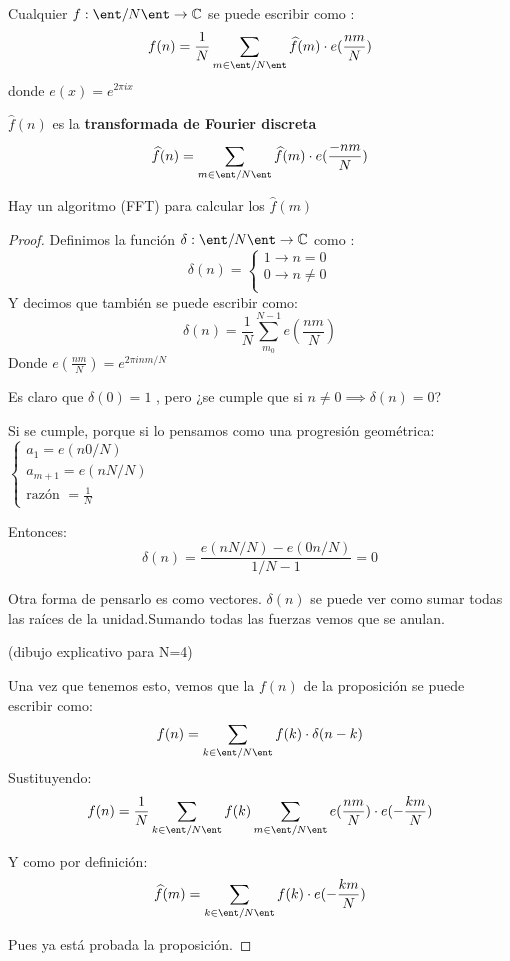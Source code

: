 \begin{prop}
	
	Cualquier $f : \ent/N\ent \rightarrow \mathbb{C}$ se puede escribir como :
	$$f(n) = \frac{1}{N}\sum_{m\in \ent/N\ent}\widehat{f}(m)\cdot e(\frac{nm}{N})$$
	donde $e(x) = e^{2\pi ix}$
	
	$\widehat{f}(n)$ es la \textbf{transformada de Fourier discreta}
	$$\widehat{f}(n) = \sum_{m\in \ent/N\ent}\widehat{f}(m)\cdot e(\frac{-nm}{N})$$
	
\end{prop}
\obs Hay un algoritmo (FFT) para calcular los $\widehat{f}(m)$

\begin{proof}
	Definimos la función $\delta : \ent/N\ent \rightarrow \mathbb{C}$ como :
	$$\delta (n) = \begin{cases}
	1 \rightarrow n=0\\
	0 \rightarrow n\neq 0 \\
	\end{cases}$$
	Y decimos que también se puede escribir como:
	$$\delta (n) = \frac{1}{N} \sum_{m_0}^{N-1} e(\frac{nm}{N})$$
	Donde $e(\frac{nm}{N}) = e^{2\pi inm/N}$
	
	Es claro que $\delta(0) = 1$ , pero ¿se cumple que si $n\neq 0 \implies \delta (n) = 0$?
	
	Si se cumple, porque si lo pensamos como una progresión geométrica:
	$\begin{cases}
	a_1 = e(n0/N)\\
	a_{m+1} = e(nN/N)\\
	\text{razón } = \frac{1}{N}
	\end{cases}$
	
	Entonces:
	$$\delta (n) = \frac{e(nN/N) - e(0n/N)}{1/N - 1} = 0$$
	
	Otra forma de pensarlo es como vectores. $\delta(n)$ se puede ver como sumar todas las raíces de la unidad.Sumando todas las fuerzas vemos que se anulan.
	
	(dibujo explicativo para N=4)
	
	Una vez que tenemos esto, vemos que la $f(n)$ de la proposición se puede escribir como:
	$$f(n) = \sum_{k\in \ent/N\ent} f(k) \cdot \delta(n-k)$$
	Sustituyendo:
	$$f(n) = \frac{1}{N} \sum_{k\in \ent/N\ent} f(k)  \sum_{m \in \ent/N\ent} e(\frac{nm}{N}) \cdot e(- \frac{km}{N})$$
	
	Y como por definición:
	$$\widehat{f}(m) = \sum_{k\in \ent/N\ent} f(k) \cdot e(- \frac{km}{N})$$
	
	Pues ya está probada la proposición.
\end{proof}
